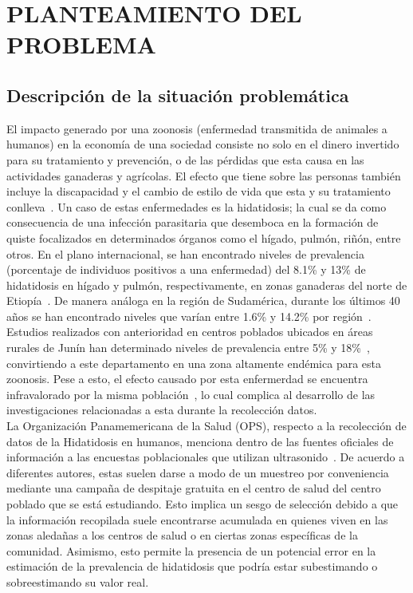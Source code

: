 \chapter{PLANTEAMIENTO DEL PROBLEMA}

\section{Descripción de la situación problemática}
El impacto generado por una zoonosis (enfermedad transmitida de animales a humanos) en la economía de una sociedad consiste no solo en el dinero invertido para su tratamiento y prevención, o de las pérdidas que esta causa en las actividades ganaderas y agrícolas. El efecto que tiene sobre las personas también incluye la discapacidad y el cambio de estilo de vida que esta y su tratamiento conlleva~\cite{shaw2017dalys}. Un caso de estas enfermedades es la hidatidosis; la cual se da como consecuencia de una infección parasitaria que desemboca en la formación de quiste focalizados en determinados órganos como el hígado, pulmón, riñón, entre otros. En el plano internacional, se han encontrado niveles de prevalencia (porcentaje de individuos positivos a una enfermedad) del 8.1\% y 13\% de hidatidosis en hígado y pulmón, respectivamente, en zonas ganaderas del norte de Etiopía~\cite{kebede2009echinococcosis}. De manera análoga en la región de Sudamérica, durante los últimos 40 años se han encontrado niveles que varían entre 1.6\% y 14.2\% por región~\cite{larrieu2004echinococcosis}. Estudios realizados con anterioridad en centros poblados ubicados en áreas rurales de Junín han determinado niveles de prevalencia entre 5\% y 18\%~\cite{santivanez2010factores}, convirtiendo a este departamento en una zona altamente endémica para esta zoonosis. Pese a esto, el efecto causado por esta enfermerdad se encuentra infravalorado por la misma población~\cite{moro2011economic}, lo cual complica al desarrollo de las investigaciones relacionadas a esta durante la recolección datos.\\

La Organización Panamemericana de la Salud (OPS), respecto a la recolección de datos de la Hidatidosis en humanos, menciona dentro de las fuentes oficiales de información a las encuestas poblacionales que utilizan ultrasonido~\cite{PAHO}. De acuerdo a diferentes autores, estas suelen darse a modo de un muestreo por conveniencia mediante una campaña de despitaje gratuita en el centro de salud del centro poblado que se está estudiando. Esto implica un sesgo de selección debido a que la información recopilada suele encontrarse acumulada en quienes viven en las zonas aledañas a los centros de salud o en ciertas zonas específicas de la comunidad. Asimismo, esto permite la presencia de un potencial error en la estimación de la prevalencia de hidatidosis que podría estar subestimando o sobreestimando su valor real.\\

